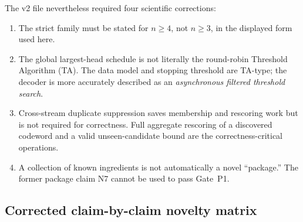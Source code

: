 \documentclass[11pt]{article}
\theoremstyle{definition}
\theoremstyle{remark}
\begin{document}
The v2 file nevertheless required four scientific corrections:
\begin{enumerate}
  \item The strict family must be stated for $n\ge4$, not $n\ge3$, in the displayed form used here.
  \item The global largest-head schedule is not literally the round-robin Threshold Algorithm (TA). The data model and stopping threshold are TA-type; the decoder is more accurately described as an \emph{asynchronous filtered threshold search}.
  \item Cross-stream duplicate suppression saves membership and rescoring work but is not required for correctness. Full aggregate rescoring of a discovered codeword and a valid unseen-candidate bound are the correctness-critical operations.
  \item A collection of known ingredients is not automatically a novel ``package.'' The former package claim N7 cannot be used to pass Gate~P1.
\end{enumerate}

\subsection{Corrected claim-by-claim novelty matrix}
\end{document}
